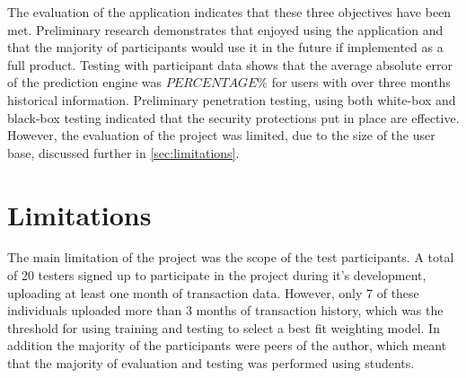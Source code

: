 The evaluation of the application indicates that these three objectives have been met. Preliminary research demonstrates that enjoyed using the application and that the majority of participants would use it in the future if implemented as a full product. Testing with participant data shows that the average absolute error of the prediction engine was $PERCENTAGE\%$ for users with over three months historical information. Preliminary penetration testing, using both white-box and black-box testing indicated that the security protections put in place are effective.  However, the evaluation of the project was limited, due to the size of the user base, discussed further in \autoref{sec:limitations}. 




\section{Limitations} \label{sec:limitations}
The main limitation of the project was the scope of the test participants. A total of 20 testers signed up to participate in the project during it's development, uploading at least one month of transaction data. However, only 7 of these individuals uploaded more than 3 months of transaction history, which was the threshold for using training and testing to select a best fit weighting model. In addition the majority of the participants were peers of the author, which meant that the majority of evaluation and testing was performed using students.

